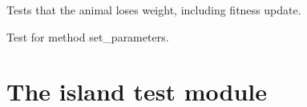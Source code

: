 \documentclass[a4paper,10pt,english]{sphinxmanual}
\begin{document}
\begin{fulllineitems}

\begin{fulllineitems}
\label{\detokenize{tests:biosim.tests.test_animals.TestAnimal.test_loss_of_weight}}
Tests that the animal loses weight, including fitness update.

\end{fulllineitems}


\begin{fulllineitems}
\label{\detokenize{tests:biosim.tests.test_animals.TestAnimal.test_set_parameters}}
Test for method set\_parameters.

\end{fulllineitems}


\end{fulllineitems}



\section{The island test module}
\label{\detokenize{tests:the-island-test-module}}\label{\detokenize{tests:module-biosim.tests.test_island}}
\end{document}
